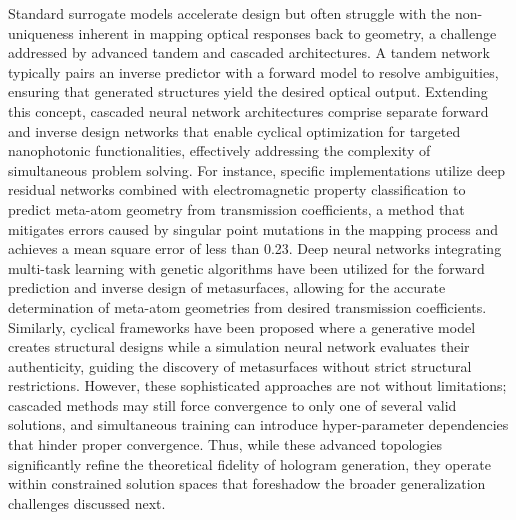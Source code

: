 \documentclass[11pt]{article}
\begin{document}
Standard surrogate models accelerate design but often struggle with the non-uniqueness inherent in mapping optical responses back to geometry, a challenge addressed by advanced tandem and cascaded architectures. A tandem network typically pairs an inverse predictor with a forward model to resolve ambiguities, ensuring that generated structures yield the desired optical output. Extending this concept, cascaded neural network architectures comprise separate forward and inverse design networks that enable cyclical optimization for targeted nanophotonic functionalities, effectively addressing the complexity of simultaneous problem solving. For instance, specific implementations utilize deep residual networks combined with electromagnetic property classification to predict meta-atom geometry from transmission coefficients, a method that mitigates errors caused by singular point mutations in the mapping process and achieves a mean square error of less than 0.23. Deep neural networks integrating multi-task learning with genetic algorithms have been utilized for the forward prediction and inverse design of metasurfaces, allowing for the accurate determination of meta-atom geometries from desired transmission coefficients. \citep{doi_10_1016_j_rio_2026_100988_b00ee173} Similarly, cyclical frameworks have been proposed where a generative model creates structural designs while a simulation neural network evaluates their authenticity, guiding the discovery of metasurfaces without strict structural restrictions. However, these sophisticated approaches are not without limitations; cascaded methods may still force convergence to only one of several valid solutions, and simultaneous training can introduce hyper-parameter dependencies that hinder proper convergence. Thus, while these advanced topologies significantly refine the theoretical fidelity of hologram generation, they operate within constrained solution spaces that foreshadow the broader generalization challenges discussed next. \citep{doi_10_1038_s41598_020_76400_y_aa62c15d} \citep{doi_10_1109_iccem60619_2024_10559188_c3199408}
\end{document}
